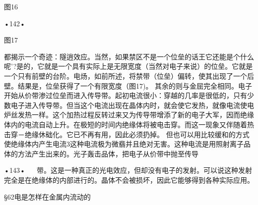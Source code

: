  

图16

•142•
  
 

图17

都揭示一个奇迹：隧逍效应。当然，如果禁区不是一个位垒的话王它还能是个什么呢'?是的，它就是一个具有实际上是无限宽度（当然对电子来说）的位垒。它就是一个只有前壁的台阶。电炀，如前所述，将禁带（位垒）偏转，使其出现了一个后壁。结果是，位垒获得了一个有限宽度（图17)。
其余的则与金屈完全相同。电子开始从价带渗过位垒而进入传导带。起初电流很小：穿越的几率是很低的，只有少数电子进入传导带。但当这个电流出现在晶体内时，就会使它发热，就像电流使电炉丝发热一样。这个加热过程反转过来又为传导带增添了新的电子大军，因而绝缘体内的电流自动上升。在极短的时间内绝缘体将被电击穿。而这一现象又伴随着热击穿－绝缘休础化。它已不再有用，因此必须扔掉。
但也可以用比较缓和的方式使绝缘体内产生电流3这种电流极为微翡并且绝对无害。这种电流是用照射离子品体的方法产生出来的。光子轰击品体，把电子从价带中抛至传导

•143•
  
带。这是一种真正的光电效应，但却没有电子的发射。可以说这种发射完全是在绝缘体的内部进行的。晶体不会被损坏，因此它能够得到各种实际应用。

§62电是怎样在金属内流动的

